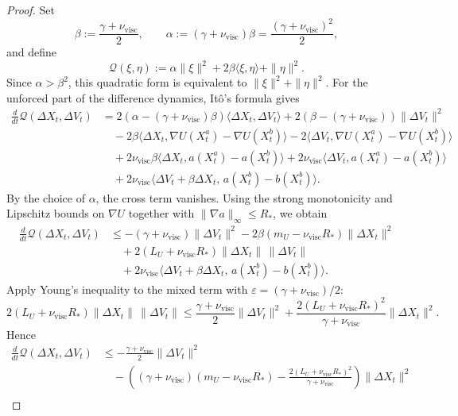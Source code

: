 \documentclass[11pt]{article}
\theoremstyle{definition}
\theoremstyle{remark}
\begin{document}
\begin{proof}
Set
\[
\beta:=\frac{\gamma+\nu_{\mathrm{visc}}}{2},
\qquad
\alpha:=(\gamma+\nu_{\mathrm{visc}})\beta=\frac{(\gamma+\nu_{\mathrm{visc}})^2}{2},
\]
and define
\[
\mathscr Q(\xi,\eta):=\alpha\|\xi\|^2+2\beta\langle \xi,\eta\rangle+\|\eta\|^2.
\]
Since \(\alpha>\beta^2\), this quadratic form is equivalent to
\(\|\xi\|^2+\|\eta\|^2\). For the unforced part of the difference dynamics,
It\^o's formula gives
\begin{align*}
\frac{d}{dt}\mathscr Q(\Delta X_t,\Delta V_t)
&=
2(\alpha-(\gamma+\nu_{\mathrm{visc}})\beta)\langle \Delta X_t,\Delta V_t\rangle
+2(\beta-(\gamma+\nu_{\mathrm{visc}}))\|\Delta V_t\|^2\\
&\quad
-2\beta\bigl\langle \Delta X_t,\nabla U(X_t^a)-\nabla U(X_t^b)\bigr\rangle
-2\bigl\langle \Delta V_t,\nabla U(X_t^a)-\nabla U(X_t^b)\bigr\rangle\\
&\quad
+2\nu_{\mathrm{visc}}\beta\langle \Delta X_t,a(X_t^a)-a(X_t^b)\rangle
+2\nu_{\mathrm{visc}}\langle \Delta V_t,a(X_t^a)-a(X_t^b)\rangle\\
&\quad
+2\nu_{\mathrm{visc}}
\bigl\langle \Delta V_t+\beta\Delta X_t,\,
a(X_t^b)-b(X_t^b)\bigr\rangle.
\end{align*}
By the choice of \(\alpha\), the cross term vanishes. Using the strong
monotonicity and Lipschitz bounds on \(\nabla U\) together with
\(\|\nabla a\|_\infty\le R_*\), we obtain
\begin{align*}
\frac{d}{dt}\mathscr Q(\Delta X_t,\Delta V_t)
&\le
-(\gamma+\nu_{\mathrm{visc}})\|\Delta V_t\|^2
-2\beta(m_U-\nu_{\mathrm{visc}}R_*)\|\Delta X_t\|^2\\
&\quad
+2(L_U+\nu_{\mathrm{visc}}R_*)\|\Delta X_t\|\,\|\Delta V_t\|\\
&\quad
+2\nu_{\mathrm{visc}}
\bigl\langle \Delta V_t+\beta\Delta X_t,\,
a(X_t^b)-b(X_t^b)\bigr\rangle.
\end{align*}
Apply Young's inequality to the mixed term with
\(\varepsilon=(\gamma+\nu_{\mathrm{visc}})/2\):
\[
2(L_U+\nu_{\mathrm{visc}}R_*)\|\Delta X_t\|\,\|\Delta V_t\|
\le
\frac{\gamma+\nu_{\mathrm{visc}}}{2}\|\Delta V_t\|^2
+\frac{2(L_U+\nu_{\mathrm{visc}}R_*)^2}{\gamma+\nu_{\mathrm{visc}}}
\|\Delta X_t\|^2.
\]
Hence
\begin{align*}
\frac{d}{dt}\mathscr Q(\Delta X_t,\Delta V_t)
&\le
-\frac{\gamma+\nu_{\mathrm{visc}}}{2}\|\Delta V_t\|^2\\
&\quad
-\left(
(\gamma+\nu_{\mathrm{visc}})(m_U-\nu_{\mathrm{visc}}R_*)
-\frac{2(L_U+\nu_{\mathrm{visc}}R_*)^2}{\gamma+\nu_{\mathrm{visc}}}
\right)\|\Delta X_t\|^2\\

\end{align*}
\end{proof}
\end{document}
